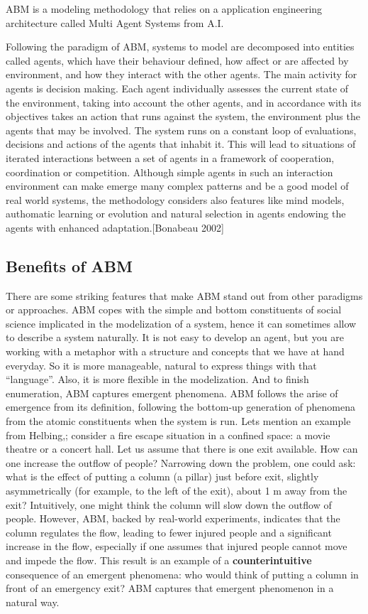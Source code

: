 \documentclass{report}
\begin{document}

ABM is a modeling methodology that relies on a application engineering architecture called Multi Agent Systems from A.I.
 
Following the paradigm of ABM, systems to model are decomposed into entities called agents, which have their behaviour defined,  how affect or are affected by environment, and how they interact with the other agents. The main activity for agents is decision making. Each agent individually assesses the current state of the environment, taking into account the other agents, and in accordance with its objectives takes an action that runs against the system, the environment plus the agents that may be involved. The system runs on a constant loop of evaluations, decisions and actions of the agents that inhabit it.
This will lead to situations of iterated interactions between a set of agents in a framework of cooperation, coordination or competition. Although simple agents in such an interaction environment can  make emerge many complex patterns and be a good model of real world systems, the methodology considers also features like mind models, authomatic learning or evolution and natural selection in agents endowing the agents with enhanced adaptation.[Bonabeau 2002]  


\subsection{Benefits of ABM}
There are  some striking features that make ABM stand out from other paradigms or approaches. ABM copes with the simple and bottom constituents of social science implicated in the modelization of a system, hence it can sometimes allow to describe a system naturally. It is not easy to develop an agent, but you are working with a metaphor  with a structure and concepts that we have at hand everyday. So it is more manageable, natural to express things with that “language”. Also, it is more flexible in the modelization. And to finish enumeration, ABM captures emergent phenomena. ABM follows the arise of emergence from its definition, following the bottom-up generation of phenomena from the atomic constituents when the system is run.
Lets mention an example from Helbing,\cite{Helbing2000}; consider a fire escape situation in a confined space: a movie theatre or a concert hall. Let us assume that there is one exit available. How can one increase the outflow of people? Narrowing down the problem, one could ask: what is the effect of putting a column (a pillar) just before exit, slightly asymmetrically (for example, to the left of the exit), about 1 m away from the exit? Intuitively, one might think the column will slow down the outflow of people. However, ABM, backed by real-world experiments, indicates that the column regulates the flow, leading to fewer injured people and a significant increase in the flow, especially if one assumes that injured people cannot move and impede the flow. This result is an example of a \textbf{counterintuitive} consequence of an emergent phenomena: who would think of putting a column in front of an emergency exit? ABM captures that emergent phenomenon in a natural way.\\
\end{document}
